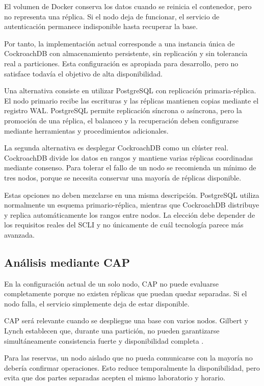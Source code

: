 \documentclass[conference]{IEEEtran}
\begin{document}
El volumen de Docker conserva los datos cuando se reinicia el contenedor, pero no representa una réplica. Si el nodo deja de funcionar, el servicio de autenticación permanece indisponible hasta recuperar la base.

Por tanto, la implementación actual corresponde a una instancia única de CockroachDB con almacenamiento persistente, sin replicación y sin tolerancia real a particiones. Esta configuración es apropiada para desarrollo, pero no satisface todavía el objetivo de alta disponibilidad.

Una alternativa consiste en utilizar PostgreSQL con replicación primaria-réplica. El nodo primario recibe las escrituras y las réplicas mantienen copias mediante el registro WAL. PostgreSQL permite replicación síncrona o asíncrona, pero la promoción de una réplica, el balanceo y la recuperación deben configurarse mediante herramientas y procedimientos adicionales.

La segunda alternativa es desplegar CockroachDB como un clúster real. CockroachDB divide los datos en rangos y mantiene varias réplicas coordinadas mediante consenso. Para tolerar el fallo de un nodo se recomienda un mínimo de tres nodos, porque se necesita conservar una mayoría de réplicas disponible.

Estas opciones no deben mezclarse en una misma descripción. PostgreSQL utiliza normalmente un esquema primario-réplica, mientras que CockroachDB distribuye y replica automáticamente los rangos entre nodos. La elección debe depender de los requisitos reales del SCLI y no únicamente de cuál tecnología parece más avanzada.

\subsection{Análisis mediante CAP}
En la configuración actual de un solo nodo, CAP no puede evaluarse completamente porque no existen réplicas que puedan quedar separadas. Si el nodo falla, el servicio simplemente deja de estar disponible.

CAP será relevante cuando se despliegue una base con varios nodos. Gilbert y Lynch establecen que, durante una partición, no pueden garantizarse simultáneamente consistencia fuerte y disponibilidad completa \cite{ref9}.

Para las reservas, un nodo aislado que no pueda comunicarse con la mayoría no debería confirmar operaciones. Esto reduce temporalmente la disponibilidad, pero evita que dos partes separadas acepten el mismo laboratorio y horario.
\end{document}
